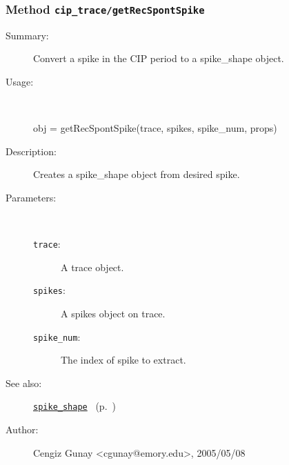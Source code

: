 \subsubsection[Method \texttt{getRecSpontSpike}]{Method \texttt{cip\_trace/getRecSpontSpike}}%
%
\label{ref_cip_trace__getRecSpontSpike}%
\hypertarget{ref_cip_trace__getRecSpontSpike}{}%
\begin{description}
\item[Summary:]Convert a spike in the CIP period to a spike\_shape object.
%
\item[Usage:]~%
\begin{lyxcode}%
obj = getRecSpontSpike(trace, spikes, spike\_num, props)
%
\end{lyxcode}%
%
\item[Description:]%
Creates a spike\_shape object from desired spike.
\item[Parameters:]~
\begin{description}%
\item[\texttt{trace}:]
 A trace object.
\item[\texttt{spikes}:]
 A spikes object on trace.
\item[\texttt{spike\_num}:]
 The index of spike to extract.
\end{description}%
%
%
%
\item[See also:]%
\hyperlink{ref_spike_shape}{\texttt{spike\_shape}}%
\ (p.~\pageref{ref_spike_shape})%
%
%
\item[Author:]%
Cengiz Gunay <cgunay@emory.edu>, 2005/05/08
%
\end{description}
\methodline%
